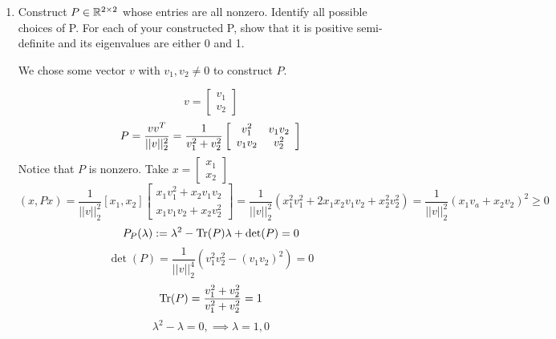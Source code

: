 \documentclass{article}
\begin{document}
\begin{enumerate}
\item Construct $P \in \mathbb{R}^{2\times2}$ whose entries are all nonzero. Identify all possible choices of P. For each of your constructed P, show that it is positive semi-definite and its eigenvalues are either 0 and 1.

We chose some vector $v$ with $v_1, v_2 \neq 0$ to construct $P$. 

\[
    v = \left[\begin{array}{c} v_1 \\ v_2\end{array}\right]
\]
\[
    P = \frac{vv^T}{||v||_2^2} = \frac{1}{v_1^2 + v_2^2}\left[\begin{array}{c  c} v_1^2 & v_1v_2 \\ v_1v_2 & v_2^2 \end{array}\right]
\]
Notice that $P$ is nonzero. Take $x = \left[\begin{array}{c} x_1 \\ x_2\end{array}\right]$
\[
    (x, Px) = \frac{1}{||v||_2^2} \left[x_1, x_2\right] \left[\begin{array}{c} x_1v_1^2 + x_2v_1v_2 \\ x_1v_1v_2 + x_2v_2^2\end{array}\right] = \frac{1}{||v||_2^2}(x_1^2v_1^2 + 2x_1x_2v_1v_2 + x_2^2v_2^2) = \frac{1}{||v||_2^2} (x_1v_a + x_2v_2)^2 \ge 0
\]
\[
    P_P(\lambda) := \lambda^2 - \text{Tr}(P)\lambda + \det(P) = 0 
\]
\[
    \det(P) = \frac{1}{||v||_2^4}(v_1^2v_2^2 - (v_1v_2)^2) = 0
\]
\[
   \text{Tr}(P) =  \frac{v_1^2 + v_2^2}{v_1^2 + v_2^2} = 1
\]
\[
    \lambda^2 - \lambda = 0, \implies \lambda = 1, 0
\]

\end{enumerate}
\end{document}
